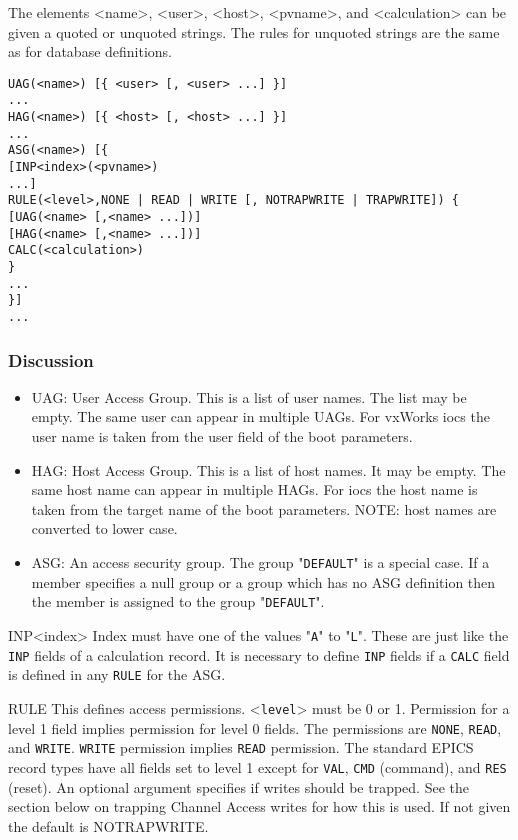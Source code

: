 The elements \textless{}name\textgreater{}, \textless{}user\textgreater{}, \textless{}host\textgreater{}, \textless{}pvname\textgreater{}, and \textless{}calculation\textgreater{} can be given a quoted or unquoted strings. The 
rules for unquoted strings are the same as for database definitions.



\begin{verbatim}UAG(<name>) [{ <user> [, <user> ...] }]
...
HAG(<name>) [{ <host> [, <host> ...] }]
...
ASG(<name>) [{
[INP<index>(<pvname>)
...]
RULE(<level>,NONE | READ | WRITE [, NOTRAPWRITE | TRAPWRITE]) {
[UAG(<name> [,<name> ...])]
[HAG(<name> [,<name> ...])]
CALC(<calculation>)
}
...
}]
...
\end{verbatim}
\subsubsection{Discussion}

\begin{itemize}\item {}UAG:  User Access Group. This is a list of user names. The list may be empty. The same user can appear in 
multiple UAGs. For vxWorks iocs the user name is taken from the user field of the boot parameters.

\item {}HAG: Host Access Group. This is a list of host names. It may be empty. The same host name can appear in 
multiple HAGs. For iocs the host name is taken from the target name of the boot parameters. NOTE: host names 
are converted to lower case.

\item {}ASG: An access security group. The group "\verb|DEFAULT|" is a special case. If a member specifies a null group or a 
group which has no ASG definition then the member is assigned to the group "\verb|DEFAULT|".

\end{itemize}INP\textless{}index\textgreater{}  Index must have one of the values "\verb|A|" to "\verb|L|". These are just like the \verb|INP| fields of a 
calculation record. It is necessary to define \verb|INP| fields if a \verb|CALC| field is defined in any \verb|RULE| for the ASG.

RULE   This defines access permissions. \textless{}\verb|level|\textgreater{} must be 0 or 1. Permission for a level 1 field implies 
permission for level 0 fields. The permissions are \verb|NONE|, \verb|READ|, and \verb|WRITE|. \verb|WRITE| permission implies 
\verb|READ| permission. The standard EPICS record types have all fields set to level 1 except for \verb|VAL|, \verb|CMD| 
(command), and \verb|RES| (reset). An optional argument specifies if writes should be trapped. See the section 
below on trapping Channel Access writes for how this is used. If not given the default is NOTRAPWRITE.

